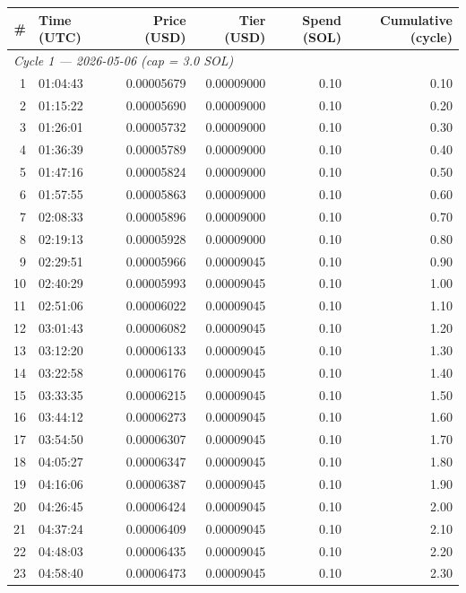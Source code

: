\documentclass[11pt,a4paper]{article}
\begin{document}
\begin{table}[h]
\centering
\small
\begin{tabular}{rlrrrr}
\toprule
\textbf{\#} & \textbf{Time (UTC)} & \textbf{Price (USD)} & \textbf{Tier (USD)} &
\textbf{Spend (SOL)} & \textbf{Cumulative (cycle)} \\
\midrule
\multicolumn{6}{l}{\emph{Cycle 1 --- 2026-05-06 (cap = 3.0 SOL)}} \\
 1 & 01:04:43 & 0.00005679 & 0.00009000 & 0.10 & 0.10 \\
 2 & 01:15:22 & 0.00005690 & 0.00009000 & 0.10 & 0.20 \\
 3 & 01:26:01 & 0.00005732 & 0.00009000 & 0.10 & 0.30 \\
 4 & 01:36:39 & 0.00005789 & 0.00009000 & 0.10 & 0.40 \\
 5 & 01:47:16 & 0.00005824 & 0.00009000 & 0.10 & 0.50 \\
 6 & 01:57:55 & 0.00005863 & 0.00009000 & 0.10 & 0.60 \\
 7 & 02:08:33 & 0.00005896 & 0.00009000 & 0.10 & 0.70 \\
 8 & 02:19:13 & 0.00005928 & 0.00009000 & 0.10 & 0.80 \\
 9 & 02:29:51 & 0.00005966 & 0.00009045 & 0.10 & 0.90 \\
10 & 02:40:29 & 0.00005993 & 0.00009045 & 0.10 & 1.00 \\
11 & 02:51:06 & 0.00006022 & 0.00009045 & 0.10 & 1.10 \\
12 & 03:01:43 & 0.00006082 & 0.00009045 & 0.10 & 1.20 \\
13 & 03:12:20 & 0.00006133 & 0.00009045 & 0.10 & 1.30 \\
14 & 03:22:58 & 0.00006176 & 0.00009045 & 0.10 & 1.40 \\
15 & 03:33:35 & 0.00006215 & 0.00009045 & 0.10 & 1.50 \\
16 & 03:44:12 & 0.00006273 & 0.00009045 & 0.10 & 1.60 \\
17 & 03:54:50 & 0.00006307 & 0.00009045 & 0.10 & 1.70 \\
18 & 04:05:27 & 0.00006347 & 0.00009045 & 0.10 & 1.80 \\
19 & 04:16:06 & 0.00006387 & 0.00009045 & 0.10 & 1.90 \\
20 & 04:26:45 & 0.00006424 & 0.00009045 & 0.10 & 2.00 \\
21 & 04:37:24 & 0.00006409 & 0.00009045 & 0.10 & 2.10 \\
22 & 04:48:03 & 0.00006435 & 0.00009045 & 0.10 & 2.20 \\
23 & 04:58:40 & 0.00006473 & 0.00009045 & 0.10 & 2.30 \\

\end{tabular}
\end{table}
\end{document}
